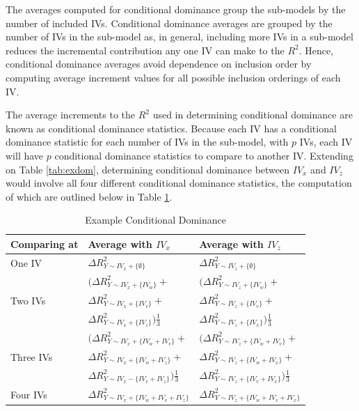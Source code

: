 \documentclass[man]{apa7}
\begin{document}
	The averages computed for conditional dominance group the sub-models by the number of included IVs.
	Conditional dominance averages are grouped by the number of IVs in the sub-model as, in general, including more IVs in a sub-model reduces the incremental contribution any one IV can make to the $R^2$.
	Hence, conditional dominance averages avoid dependence on inclusion order by computing average increment values for all possible inclusion orderings of each IV.
	
	The average increments to the $R^2$ used in determining conditional dominance are known as conditional dominance statistics.
	Because each IV has a conditional dominance statistic for each number of IVs in the sub-model, with $p$ IVs, each IV will have $p$ conditional dominance statistics to compare to another IV.
	Extending on Table \ref{tab:exdom}, determining conditional dominance between $IV_x$ and $IV_z$ would involve all four different conditional dominance statistics, the computation of which are outlined below in Table \ref{tab:excdl}.
	
	\begin{table}[h!]
		\centering
		\caption{\centering Example Conditional Dominance}
		\begin{tabular}{ l | l l }
			Comparing at & Average with $IV_x$ & Average with $IV_z$ \\
			\hline
			One IV & $\Delta R^2_{Y \sim IV_x + \{\emptyset\}}$ & $\Delta R^2_{Y \sim IV_z + \{\emptyset\}}$ \\
			\hline
			& $(\Delta R^2_{Y \sim IV_x + \{IV_w\}} + $ & $(\Delta R^2_{Y \sim IV_z + \{IV_w\}} + $ \\
			Two IVs & $\Delta R^2_{Y \sim IV_x + \{IV_v\}} + $ & $\Delta R^2_{Y \sim IV_z + \{IV_v\}} + $ \\
			& $\Delta R^2_{Y \sim IV_x + \{IV_z\}})\frac{1}{3}$ & $\Delta R^2_{Y \sim IV_z + \{IV_x\}})\frac{1}{3} $ \\
			\hline
			& $(\Delta R^2_{Y \sim IV_x + \{IV_w + IV_v\}} + $ & $(\Delta R^2_{Y \sim IV_z + \{IV_w + IV_v\}} + $ \\
			Three IVs & $\Delta R^2_{Y \sim IV_x + \{IV_w + IV_z\}} + $ & $\Delta R^2_{Y \sim IV_z + \{IV_w + IV_x\}} + $ \\
			& $\Delta R^2_{Y \sim IV_x - \{IV_v + IV_z\}})\frac{1}{3}$ & $\Delta R^2_{Y \sim IV_z + \{IV_v + IV_x\}})\frac{1}{3}$ \\
			\hline
			Four IVs & $\Delta R^2_{Y \sim IV_x + \{IV_w + IV_v + IV_z\}}$ & $\Delta R^2_{Y \sim IV_z + \{IV_w + IV_v + IV_x\}}$ \\
			\hline
		\end{tabular}
		\label{tab:excdl}
	\end{table}
	
\end{document}
